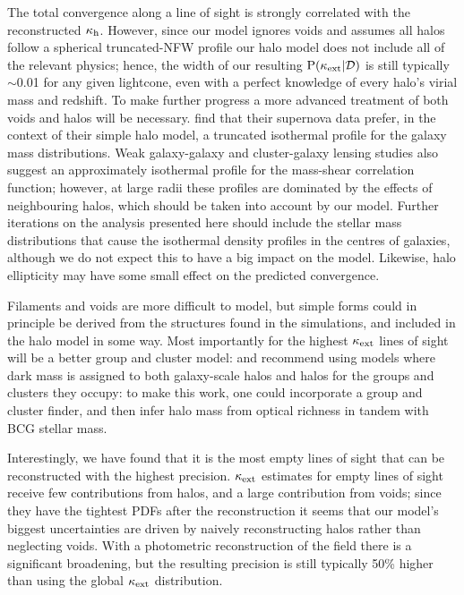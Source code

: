 \documentclass[useAMS,usenatbib]{mn2e}
\begin{document}
The total convergence along a line of sight is strongly correlated with the
reconstructed $\kappa_{\rm h}$. However, since our model ignores voids and assumes
all halos follow a spherical truncated-NFW profile our halo model does not
include all of the relevant physics; hence, the width of our resulting
${\rm P}(\kappa_{\rm ext}|{\mathcal{D}})$ is still typically $\sim$0.01 for any given lightcone,
even with a perfect knowledge of every halo's virial mass and redshift. To
make further progress a more advanced treatment of both voids and halos will
be necessary. \citet{KarpenkaEtal2012} find that their supernova data prefer,
in the context of their simple halo model, a truncated isothermal profile for
the galaxy mass distributions. Weak galaxy-galaxy and cluster-galaxy  lensing
studies \citep[\eg][]{GavazziEtal2006,JohnstonEtal2007} also suggest an
approximately isothermal profile for the mass-shear correlation function;
however, at large radii these profiles are dominated by the effects of
neighbouring halos, which should be taken into account by our model. Further
iterations on the analysis presented here should include the stellar mass
distributions that cause the isothermal density profiles in the centres of
galaxies, although we do not expect this to have a big impact on the model.
Likewise,  halo ellipticity may have some small effect on the predicted
convergence. 

Filaments and voids are more difficult to model, but simple forms could in
principle be derived from the structures found in the simulations, and
included in the halo model in some way. Most importantly for the highest
$\kappa_{\rm ext}$ lines of sight will be a better group and cluster model:
\citet{MomchevaEtal2006} and  \citet{WongEtal2011} recommend using models
where dark mass is assigned to both galaxy-scale halos and halos for the
groups and clusters they occupy: to make this work, one could incorporate  a
group and cluster finder, and then infer halo mass from optical richness
\citep[\eg][]{MaxBCG} in tandem with BCG stellar mass.

Interestingly, we have found that it is the most empty lines of sight that 
can be reconstructed with the highest precision. $\kappa_{\rm ext}$ estimates for empty
lines of sight receive few contributions from halos, and a large contribution
from voids; since they have the tightest PDFs after the reconstruction it
seems that our model's biggest uncertainties are driven by naively
reconstructing halos rather than neglecting voids. With a photometric
reconstruction of the field there is a significant broadening, but the
resulting precision is still typically 50\%  higher than using the global
$\kappa_{\rm ext}$ distribution. 
\end{document}
